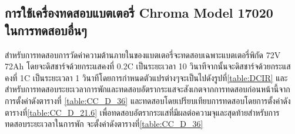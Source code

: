 \subsection{การใช้เครื่องทดสอบแบตเตอรี่ Chroma Model 17020 \\ ในการทดสอบอื่นๆ}
สำหรับการทดสอบการวัดค่าความต้านภายในของแบตเตอรี่จะทดสอบเฉพาะแบตเตอรี่พิกัด 72V 72Ah โดยจะดิสชาร์จด้วยกระแสคงที่ 0.2C เป็นระยะเวลา 10 วินาทีจากนั้นจะดิสชาร์จด้วยกระแสคงที่ 
1C เป็นระยะเวลา 1 วินาทีโดยการกำหนดตัวแปรต่างๆจะเป็นไปดังรูปที่\ref{table:DCIR} และสำหรับการทดสอบระยะเวลาการพักและทดสอบอัตรากระแสจะสังเกตจากการทดสอบก่อนหน้านี้จากการตั้งค่าดังตารางที่
\ref{table:CC_D_36} และทดสอบโดยเปรียบเทียบการทดสอบโดยการตั้งค่าดังตารางที่\ref{table:CC_D_21.6} เพื่อทดสอบอัตรากระแสที่มีผลต่อความจุและสุดท้ายสำหรับการทดสอบระยะเวลาในการพัก
จะตั้งค่าดังตารางที่\ref{table:CC_D_36}
\begin{center}


\begin{table}[H]
\centering
\caption{การตั้งค่าสำหรับการทดสอบวัดค่าความต้านทานภายในของแบตเตอรี่ 72V72Ah}
\label{table:DCIR}
\end{table}


\end{center}
